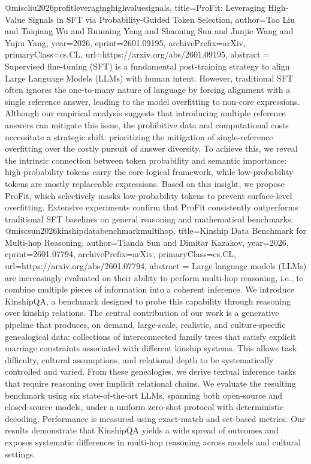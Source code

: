 {}@misc{liu2026profitleveraginghighvaluesignals,
      title={ProFit: Leveraging High-Value Signals in SFT via Probability-Guided Token Selection}, 
      author={Tao Liu and Taiqiang Wu and Runming Yang and Shaoning Sun and Junjie Wang and Yujiu Yang},
      year={2026},
      eprint={2601.09195},
      archivePrefix={arXiv},
      primaryClass={cs.CL},
      url={https://arxiv.org/abs/2601.09195},
      abstract = {Supervised fine-tuning (SFT) is a fundamental post-training strategy to align Large Language Models (LLMs) with human intent. However, traditional SFT often ignores the one-to-many nature of language by forcing alignment with a single reference answer, leading to the model overfitting to non-core expressions. Although our empirical analysis suggests that introducing multiple reference answers can mitigate this issue, the prohibitive data and computational costs necessitate a strategic shift: prioritizing the mitigation of single-reference overfitting over the costly pursuit of answer diversity. To achieve this, we reveal the intrinsic connection between token probability and semantic importance: high-probability tokens carry the core logical framework, while low-probability tokens are mostly replaceable expressions. Based on this insight, we propose ProFit, which selectively masks low-probability tokens to prevent surface-level overfitting. Extensive experiments confirm that ProFit consistently outperforms traditional SFT baselines on general reasoning and mathematical benchmarks.}
}@misc{sun2026kinshipdatabenchmarkmultihop,
      title={Kinship Data Benchmark for Multi-hop Reasoning}, 
      author={Tianda Sun and Dimitar Kazakov},
      year={2026},
      eprint={2601.07794},
      archivePrefix={arXiv},
      primaryClass={cs.CL},
      url={https://arxiv.org/abs/2601.07794},
      abstract = {Large language models (LLMs) are increasingly evaluated on their ability to perform multi-hop reasoning, i.e., to combine multiple pieces of information into a coherent inference. We introduce KinshipQA, a benchmark designed to probe this capability through reasoning over kinship relations. The central contribution of our work is a generative pipeline that produces, on demand, large-scale, realistic, and culture-specific genealogical data: collections of interconnected family trees that satisfy explicit marriage constraints associated with different kinship systems. This allows task difficulty, cultural assumptions, and relational depth to be systematically controlled and varied. From these genealogies, we derive textual inference tasks that require reasoning over implicit relational chains. We evaluate the resulting benchmark using six state-of-the-art LLMs, spanning both open-source and closed-source models, under a uniform zero-shot protocol with deterministic decoding. Performance is measured using exact-match and set-based metrics. Our results demonstrate that KinshipQA yields a wide spread of outcomes and exposes systematic differences in multi-hop reasoning across models and cultural settings.}
}
